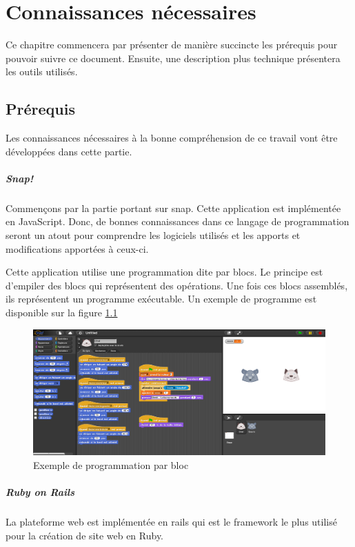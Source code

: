 \chapter{Connaissances nécessaires}
Ce chapitre commencera par présenter de manière succincte les prérequis pour pouvoir suivre ce document. Ensuite, une description plus technique présentera les outils utilisés.

\section{Prérequis}
Les connaissances nécessaires à la bonne compréhension de ce travail vont être développées dans cette partie.

\paragraph{Snap!} Commençons par la partie portant sur \gls{snap}. Cette application est implémentée en JavaScript. Donc, de bonnes connaissances dans ce langage de programmation seront un atout pour comprendre les logiciels utilisés et les apports et modifications apportées à ceux-ci.

Cette application utilise une programmation dite par \glspl{bloc}. Le principe est d'empiler des \glspl{bloc} qui représentent des opérations. Une fois ces \glspl{bloc} assemblés, ils représentent un programme exécutable. Un exemple de programme est disponible sur la figure \ref{fig:prog}

\begin{figure}
  \begin{center}
  \includegraphics[width=\textwidth]{content/4-prerequis/images/snap}
        \caption{Exemple de programmation par bloc}
    \label{fig:prog}
  \end{center}
\end{figure}


\paragraph{Ruby on Rails}
La plateforme web est implémentée en \gls{rails} qui est le framework le plus utilisé pour la création de site web en Ruby.

